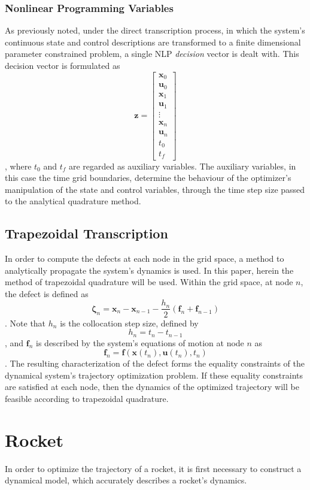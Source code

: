 \documentclass{article}
\begin{document}
\subsubsection{Nonlinear Programming Variables}
As previously noted, under the direct transcription process, in which the system's continuous state and control descriptions are transformed to a finite dimensional parameter constrained problem, a single NLP \textit{decision} vector is dealt with. This decision vector is formulated as
$$
\mathbf{z} =
\begin{bmatrix}
\mathbf{x}_0 \\
\mathbf{u}_0 \\
\mathbf{x}_1 \\
\mathbf{u}_1 \\
\vdots \\
\mathbf{x}_n \\
\mathbf{u}_n \\
t_0 \\
t_f 
\end{bmatrix}
$$,
where $t_0$ and $t_f$ are regarded as auxiliary variables. The auxiliary variables, in this case the time grid boundaries, determine the behaviour of the optimizer's manipulation of the state and control variables, through the time step size passed to the analytical quadrature method.

\subsection{Trapezoidal Transcription}
In order to compute the defects at each node in the grid space, a method to analytically propagate the system's dynamics is used. In this paper, herein the method of trapezoidal quadrature will be used. Within the grid space, at node $n$, the defect is defined as 
$$
\mathbf{\zeta}_n = \mathbf{x}_n - \mathbf{x}_{n-1} - \frac{h_n}{2}(\mathbf{f}_n + \mathbf{f}_{n-1})
$$.
Note that $h_n$ is the collocation step size, defined by
$$
h_n = t_n - t_{n-1}
$$,
and $\mathbf{f}_n$ is described by the system's equations of motion at node $n$ as
$$
\mathbf{f}_n = \mathbf{f}(\mathbf{x}(t_n),\mathbf{u}(t_n),t_n)
$$.
The resulting characterization of the defect forms the equality constraints of the dynamical system's trajectory optimization problem. If these equality constraints are satisfied at each node, then the dynamics of the optimized trajectory will be feasible according to trapezoidal quadrature.

\section{Rocket}
In order to optimize the trajectory of a rocket, it is first necessary to construct a dynamical model, which accurately describes a rocket's dynamics.
\end{document}
